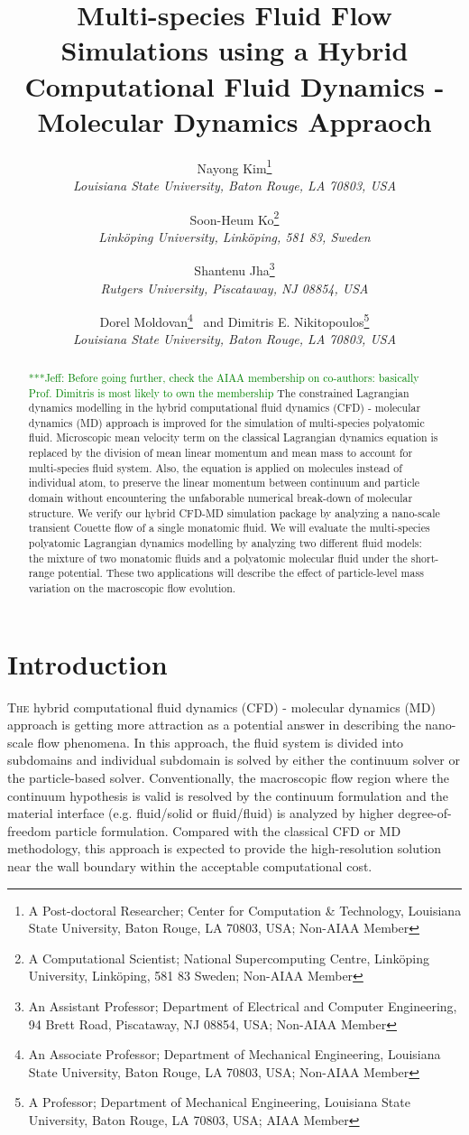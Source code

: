 \documentclass[]{aiaa-tc}%
\title{Multi-species Fluid Flow Simulations using a Hybrid Computational Fluid Dynamics - Molecular Dynamics Appraoch 
 \skonote{Or "Polyatomic Lagrangian Dynamics Modelling for a Hybrid Computational Fluid Dynamics - Molecular Dynamics Appraoch"} }
\author{
  Nayong Kim\thanks{A Post-doctoral Researcher; Center for Computation \& Technology,
  Louisiana State University, Baton Rouge, LA 70803, USA; Non-AIAA Member}\\
  {\normalsize\itshape
   Louisiana State University, Baton Rouge, LA 70803, USA}\\
  \and
  Soon-Heum Ko\thanks{A Computational Scientist; National Supercomputing Centre,
  Link\"{o}ping University, Link\"{o}ping, 581 83 Sweden; Non-AIAA Member}\\
  {\normalsize\itshape
   Link\"{o}ping University, Link\"{o}ping, 581 83, Sweden}\\
  \and
  Shantenu Jha\thanks{An Assistant Professor; Department of Electrical and Computer Engineering,
  94 Brett Road, Piscataway, NJ 08854, USA; Non-AIAA Member}\\
  {\normalsize\itshape
   Rutgers University, Piscataway, NJ 08854, USA}\\
  \and
  Dorel Moldovan\thanks{An Associate Professor; Department of Mechanical Engineering,
  Louisiana State University, Baton Rouge, LA 70803, USA; Non-AIAA Member}
    \ and
  Dimitris E. Nikitopoulos\thanks{A Professor; Department of Mechanical Engineering,
  Louisiana State University, Baton Rouge, LA 70803, USA; AIAA Member}\\
  {\normalsize\itshape
   Louisiana State University, Baton Rouge, LA 70803, USA}\\
 }
\newcommand{\skonote}[1]{ {\textcolor{green} { ***Jeff: #1 }}}
\begin{document}
\maketitle


\begin{abstract}
\skonote{Before going further, check the AIAA membership on co-authors: basically Prof. Dimitris is most likely to own the membership}
The constrained Lagrangian dynamics modelling in the hybrid computational fluid dynamics (CFD) - molecular dynamics (MD) approach is improved for the simulation of multi-species polyatomic fluid.
Microscopic mean velocity term on the classical Lagrangian dynamics equation is replaced by the division of mean linear momentum and mean mass to account for multi-species fluid system.
Also, the equation is applied on molecules instead of individual atom, to preserve the linear momentum between continuum and particle domain without encountering the unfaborable numerical break-down of molecular structure.
We verify our hybrid CFD-MD simulation package by analyzing a nano-scale transient Couette flow of a single monatomic fluid.
We will evaluate the multi-species polyatomic Lagrangian dynamics modelling by analyzing two different fluid models: the mixture of two monatomic fluids and a polyatomic molecular fluid under the short-range potential.
These two applications will describe the effect of particle-level mass variation on the macroscopic flow evolution.
\end{abstract}




\section{Introduction}
\label{sec:intro}

\lettrine[nindent=0pt]{T}{he} hybrid computational fluid dynamics (CFD) - 
molecular dynamics (MD) approach is getting more attraction as a potential 
answer in describing the nano-scale flow phenomena. In this approach,
the fluid system is divided into subdomains and individual subdomain is
solved by either the continuum solver or the particle-based solver.
Conventionally, the macroscopic flow region where the continuum hypothesis is
valid is resolved by the continuum formulation and the material interface 
(e.g. fluid/solid or fluid/fluid) is analyzed by higher degree-of-freedom 
particle formulation. Compared with the classical CFD or MD methodology, 
this approach is expected to provide the high-resolution solution near 
the wall boundary within the acceptable computational cost.
\end{document}
